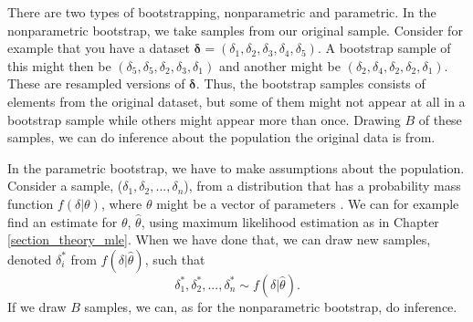 


There are two types of bootstrapping, nonparametric and parametric. In the nonparametric bootstrap, we take samples from our original sample. Consider for example that you have a dataset $\boldsymbol{\delta}=(\delta_1,\delta_2,\delta_3,\delta_4,\delta_{5})$. A bootstrap sample of this might then be $(\delta_5,\delta_5,\delta_2,\delta_3,\delta_1)$ and another might be $(\delta_2,\delta_{4},\delta_{2},\delta_{2},\delta_{1})$. These are resampled versions of $\boldsymbol{\delta}$. Thus, the bootstrap samples consists of elements from the original dataset, but some of them might not appear at all in a bootstrap sample while others might appear more than once. Drawing $B$ of these samples, we can do inference about the population the original data is from. 

In the parametric bootstrap, we have to make assumptions about the population. Consider a sample, ($\delta_1,\delta_2,...,\delta_n$), from a distribution that has a probability mass function $f(\delta|\theta)$, where $\theta$ might be a vector of parameters \citep{statinf}. We can for example find an estimate for $\theta$, $\hat{\theta}$, using maximum likelihood estimation as in Chapter \ref{section_theory_mle}. When we have done that, we can draw new samples, denoted $\delta_i^*$ from $f(\delta|\hat{\theta})$, such that
\begin{equation*}
    \delta_1^*,\delta_2^*,...,\delta_n^* \sim f(\delta|\hat{\theta}).
\end{equation*}
If we draw $B$ samples, we can, as for the nonparametric bootstrap, do inference. 




